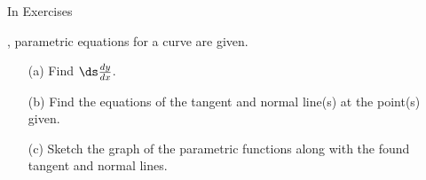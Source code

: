 {\noindent In Exercises}
{, parametric equations for a curve are given.
\begin{enumerate}
	\item [(a)] Find $\ds\frac{dy}{dx}$.
	\item [(b)] Find the equations of the tangent and normal line(s) at the point(s) given.
	\item	[(c)] Sketch the graph of the parametric functions along with the found tangent and normal lines.
\end{enumerate}
}
